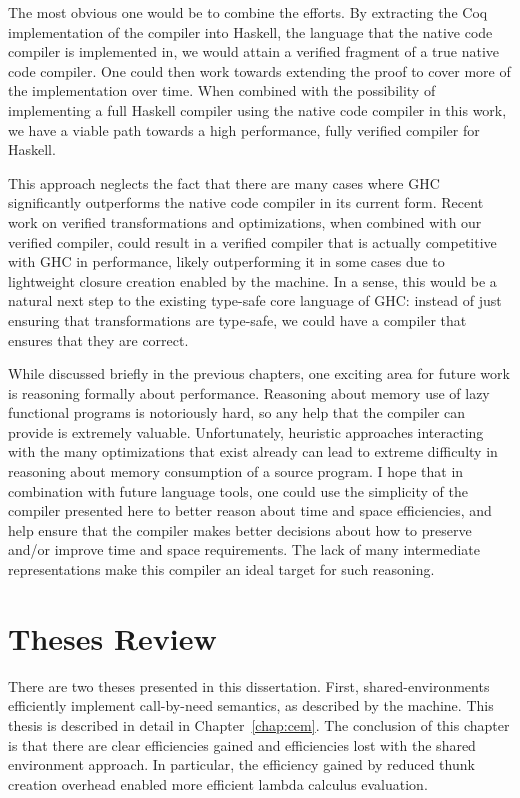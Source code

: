 The most obvious one would be to combine the efforts. By extracting the Coq
implementation of the compiler into Haskell, the language that the native code
compiler is implemented in, we would attain a verified fragment of a true native
code compiler. One could then work towards extending the proof to cover more of
the implementation over time. When combined with the possibility of implementing
a full Haskell compiler using the native code compiler in this work, we have a
viable path towards a high performance, fully verified compiler for Haskell. 

This approach neglects the fact that there are many cases where GHC
significantly outperforms the native code compiler in its current form. Recent
work on verified transformations and optimizations, when combined with our
verified compiler, could result in a verified compiler that is actually
competitive with GHC in performance, likely outperforming it in some cases due
to lightweight closure creation enabled by the \ce machine. In a sense, this
would be a natural next step to the existing type-safe core language of GHC:
instead of just ensuring that transformations are type-safe, we could have a
compiler that ensures that they are correct.

While discussed briefly in the previous chapters, one exciting area for future
work is reasoning formally about performance. Reasoning about memory use of lazy
functional programs is notoriously hard, so any help that the compiler can
provide is extremely valuable. Unfortunately, heuristic approaches interacting
with the many optimizations that exist already can lead to extreme difficulty in
reasoning about memory consumption of a source program. I hope that in
combination with future language tools, one could use the simplicity of the
compiler presented here to better reason about time and space efficiencies, and
help ensure that the compiler makes better decisions about how to preserve
and/or improve time and space requirements. The lack of many intermediate
representations make this compiler an ideal target for such reasoning.

\section{Theses Review}

There are two theses presented in this dissertation. First, shared-environments
efficiently implement call-by-need semantics, as described by the \ce machine.
This thesis is described in detail in Chapter~\ref{chap:cem}. The conclusion of
this chapter is that there are clear efficiencies gained and efficiencies lost
with the shared environment approach. In particular, the efficiency gained by
reduced thunk creation overhead enabled more efficient lambda calculus
evaluation. 

